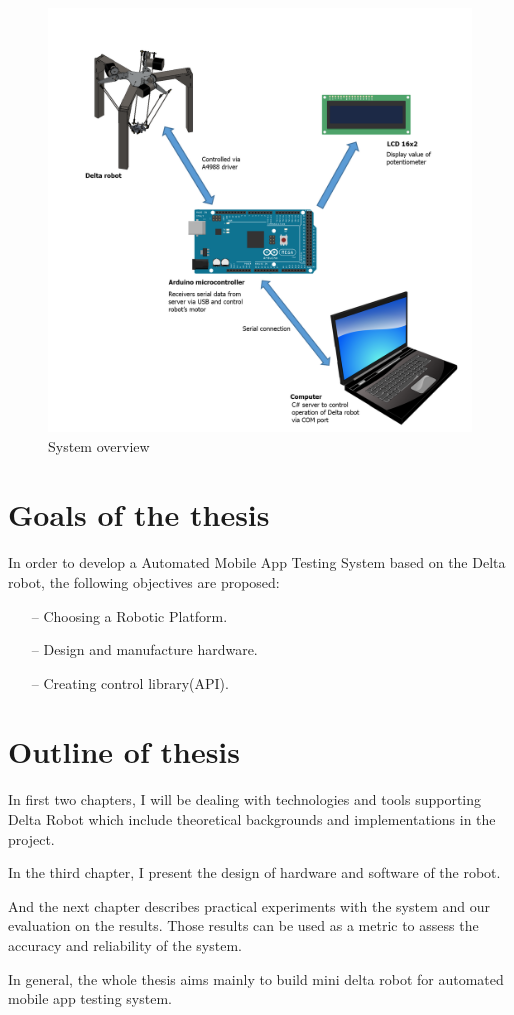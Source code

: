 \begin{figure}[H]
	\centering
	\includegraphics[width=\maxwidth{15cm}, keepaspectratio]{Chapters/Fig/system_overview.png}
	\caption{System overview}
	\label{fig:system_overview}
\end{figure}

\section{Goals of the thesis}
In order to develop a Automated Mobile App Testing System based on the Delta robot, the following objectives are proposed:
	\begin{itemize}
		\item[--] Choosing a Robotic Platform.
		\item[--] Design and manufacture hardware.
		\item[--] Creating control library(API).
	\end{itemize}

\section{Outline of thesis}

In first two chapters, I will be dealing with technologies and tools supporting Delta Robot which include theoretical backgrounds and implementations in the project.

In the third chapter, I present the design of hardware and software of the robot.

And the next chapter describes practical experiments with the system and our evaluation on the results. Those results can be used as a metric to assess the accuracy and reliability of the system.

In general, the whole thesis aims mainly to build mini delta robot for automated mobile app testing system. \nocite{radim_thesis}